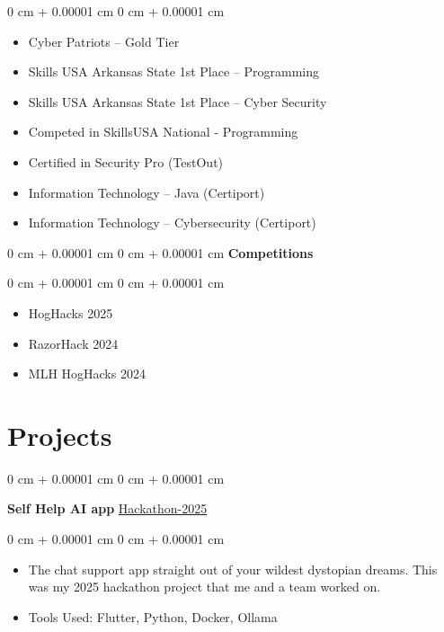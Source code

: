 \documentclass[10pt, letterpaper]{article}
\newenvironment{highlights}{
    \begin{itemize}[
        topsep=0.10 cm,
        parsep=0.10 cm,
        partopsep=0pt,
        itemsep=0pt,
        leftmargin=0 cm + 10pt
    ]
}{
    \end{itemize}
} %
\newenvironment{onecolentry}{
    \begin{adjustwidth}{
        0 cm + 0.00001 cm
    }{
        0 cm + 0.00001 cm
    }
}{
    \end{adjustwidth}
} %
\newenvironment{twocolentry}[2][]{
    \onecolentry
    \def\secondColumn{#2}
    \setcolumnwidth{\fill, 4.5 cm}
    \begin{paracol}{2}
}{
    \switchcolumn \raggedleft \secondColumn
    \end{paracol}
    \endonecolentry
} %
\begin{document}
        \vspace{0.10 cm}
        \begin{onecolentry}
            \begin{highlights}
                \item Cyber Patriots – Gold Tier
                \item Skills USA Arkansas State 1st Place – Programming
                \item Skills USA Arkansas State 1st Place – Cyber Security
                \item Competed in SkillsUSA National - Programming 
                \item Certified in Security Pro (TestOut)
                \item Information Technology – Java (Certiport)
                \item Information Technology – Cybersecurity (Certiport)
            \end{highlights}
        \end{onecolentry}
        \vspace{0.10 cm}
       \begin{onecolentry}{
        }
            \textbf{Competitions}\end{onecolentry}
            
        \vspace{0.10 cm}
        \begin{onecolentry}
            \begin{highlights}
                \item HogHacks 2025
                \item RazorHack 2024 
                \item MLH HogHacks 2024
            \end{highlights}
        \end{onecolentry}


    \section{Projects}

        \begin{twocolentry}{
            \href{https://github.com/andrewamidei/Hackathon-2025}{Hackathon-2025}
        }
            \textbf{Self Help AI app}\end{twocolentry}

        \vspace{0.10 cm}
        \begin{onecolentry}
            \begin{highlights}
                \item The chat support app straight out of your wildest dystopian dreams. This was my 2025 hackathon project that me and a team worked on. 
                \item Tools Used: Flutter, Python, Docker, Ollama
            \end{highlights}
        \end{onecolentry}
\end{document}
